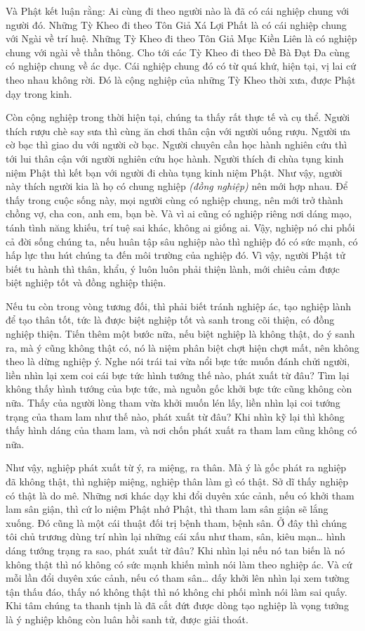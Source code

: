 \documentclass[
  12pt,
  oneside]{book}
\begin{document}
Và Phật kết luận rằng: Ai cùng đi theo người nào là đã có cái nghiệp chung với người đó. Những Tỳ Kheo đi theo Tôn Giả Xá Lợi Phất là có cái nghiệp chung với Ngài về trí huệ. Những Tỳ Kheo đi theo Tôn Giả Mục Kiền Liên là có nghiệp chung với ngài về thần thông. Cho tới các Tỳ Kheo đi theo Đề Bà Đạt Đa cùng có nghiệp chung về ác dục. Cái nghiệp chung đó có từ quá khứ, hiện tại, vị lai cứ theo nhau không rời. Đó là cộng nghiệp của những Tỳ Kheo thời xưa, được Phật dạy trong kinh.

Còn cộng nghiệp trong thời hiện tại, chúng ta thấy rất thực tế và cụ thể. Người thích rượu chè say sưa thì cùng ăn chơi thân cận với người uống rượu. Người ưa cờ bạc thì giao du với người cờ bạc. Người chuyên cần học hành nghiên cứu thì tới lui thân cận với người nghiên cứu học hành. Người thích đi chùa tụng kinh niệm Phật thì kết bạn với người đi chùa tụng kinh niệm Phật. Như vậy, người này thích người kia là họ có chung nghiệp \emph{(đồng nghiệp)} nên mới hợp nhau. Để thấy trong cuộc sống này, mọi người cùng có nghiệp chung, nên mới trở thành chồng vợ, cha con, anh em, bạn bè. Và vì ai cũng có nghiệp riêng nơi dáng mạo, tánh tình năng khiếu, trí tuệ sai khác, không ai giống ai. Vậy, nghiệp nó chi phối cả đời sống chúng ta, nếu huân tập sâu nghiệp nào thì nghiệp đó có sức mạnh, có hấp lực thu hút chúng ta đến môi trường của nghiệp đó. Vì vậy, người Phật tử biết tu hành thì thân, khẩu, ý luôn luôn phải thiện lành, mới chiêu cảm được biệt nghiệp tốt và đồng nghiệp thiện.

Nếu tu còn trong vòng tương đối, thì phải biết tránh nghiệp ác, tạo nghiệp lành để tạo thân tốt, tức là được biệt nghiệp tốt và sanh trong cõi thiện, có đồng nghiệp thiện. Tiến thêm một bước nữa, nếu biệt nghiệp là không thật, do ý sanh ra, mà ý cũng không thật có, nó là niệm phân biệt chợt hiện chợt mất, nên không theo là dừng nghiệp ý. Nghe nói trái tai vừa nổi bực tức muốn đánh chửi người, liền nhìn lại xem coi cái bực tức hình tướng thế nào, phát xuất từ đâu? Tìm lại không thấy hình tướng của bực tức, mà nguồn gốc khởi bực tức cũng không còn nữa. Thấy của người lòng tham vừa khởi muốn lén lấy, liền nhìn lại coi tướng trạng của tham lam như thế nào, phát xuất từ đâu? Khi nhìn kỹ lại thì không thấy hình dáng của tham lam, và nơi chốn phát xuất ra tham lam cũng không có nữa.

Như vậy, nghiệp phát xuất từ ý, ra miệng, ra thân. Mà ý là gốc phát ra nghiệp đã không thật, thì nghiệp miệng, nghiệp thân làm gì có thật. Sở dĩ thấy nghiệp có thật là do mê. Những nơi khác dạy khi đổi duyên xúc cảnh, nếu có khởi tham lam sân giận, thì cứ lo niệm Phật nhớ Phật, thì tham lam sân giận sẽ lắng xuống. Đó cũng là một cái thuật đối trị bệnh tham, bệnh sân. Ở đây thì chúng tôi chủ trương dùng trí nhìn lại những cái xấu như tham, sân, kiêu mạn\ldots{} hình dáng tướng trạng ra sao, phát xuất từ đâu? Khi nhìn lại nếu nó tan biến là nó không thật thì nó không có sức mạnh khiến mình nói làm theo nghiệp ác. Và cứ mỗi lần đổi duyên xúc cảnh, nếu có tham sân\ldots{} dấy khởi lên nhìn lại xem tường tận thấu đáo, thấy nó không thật thì nó không chi phối mình nói làm sai quấy. Khi tâm chúng ta thanh tịnh là đã cắt đứt được dòng tạo nghiệp là vọng tưởng là ý nghiệp không còn luân hồi sanh tử, được giải thoát.
\end{document}
